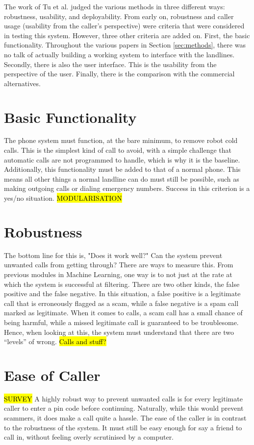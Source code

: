 \documentclass[main.tex]{subfiles}
\begin{document}
The work of Tu et al. \cite{cisco} judged the various methods in three different ways: robustness, usability, and deployability. From early on, robustness and caller usage (usability from the caller's perspective) were criteria that were considered in testing this system. However, three other criteria are added on. First, the basic functionality. Throughout the various papers in Section \ref{sec:methods}, there was no talk of actually building a working system to interface with the landlines. Secondly, there is also the user interface. This is the usability from the perspective of the user. Finally, there is the comparison with the commercial alternatives.

\section{Basic Functionality}
The phone system must function, at the bare minimum, to remove robot cold calls. This is the simplest kind of call to avoid, with a simple challenge that automatic calls are not programmed to handle, which is why it is the baseline. Additionally, this functionality must be added to that of a normal phone. This means all other things a normal landline can do must still be possible, such as making outgoing calls or dialing emergency numbers. Success in this criterion is a yes/no situation.
\hl{MODULARISATION}


\section{Robustness}
The bottom line for this is, "Does it work well?" Can the system prevent unwanted calls from getting through? There are ways to measure this. From previous modules in Machine Learning, one way is to not just at the rate at which the system is successful at filtering. There are two other kinds, the false positive and the false negative. In this situation, a false positive is a legitimate call that is erroneously flagged as a scam, while a false negative is a spam call marked as legitimate. When it comes to calls, a scam call has a small chance of being harmful, while a missed legitimate call is guaranteed to be troublesome. Hence, when looking at this, the system must understand that there are two ``levels'' of wrong. \hl{Calls and stuff?}

\section{Ease of Caller}
\hl{SURVEY}
A highly robust way to prevent unwanted calls is for every legitimate caller to enter a pin code before continuing. Naturally, while this would prevent scammers, it does make a call quite a hassle. The ease of the caller is in contrast to the robustness of the system. It must still be easy enough for say a friend to call in, without feeling overly scrutinised by a computer.
\end{document}
